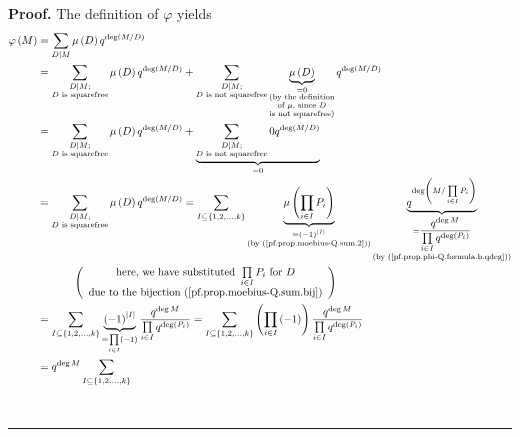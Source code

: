 \documentclass[numbers=enddot,12pt,final,onecolumn,notitlepage]{scrartcl}%
\theoremstyle{definition}
\newenvironment{proof}[1][Proof]{\noindent\textbf{#1.} }{\ \rule{0.5em}{0.5em}}
\let\sumnonlimits\sum
\let\prodnonlimits\prod
\renewcommand{\sum}{\sumnonlimits\limits}
\renewcommand{\prod}{\prodnonlimits\limits}
\begin{document}
\begin{proof}
The definition of $\varphi$ yields%
\begin{align*}
\varphi\left(  M\right)   &  =\sum\limits_{D\mid M}\mu\left(  D\right)
q^{\deg\left(  M/D\right)  }\\
&  =\sum_{\substack{D\mid M;\\D\text{ is squarefree}}}\mu\left(  D\right)
q^{\deg\left(  M/D\right)  }+\sum_{\substack{D\mid M;\\D\text{ is not
squarefree}}}\underbrace{\mu\left(  D\right)  }_{\substack{=0\\\text{(by the
definition}\\\text{of }\mu\text{, since }D\\\text{is not squarefree)}}%
}q^{\deg\left(  M/D\right)  }\\
&  =\sum_{\substack{D\mid M;\\D\text{ is squarefree}}}\mu\left(  D\right)
q^{\deg\left(  M/D\right)  }+\underbrace{\sum_{\substack{D\mid M;\\D\text{ is
not squarefree}}}0q^{\deg\left(  M/D\right)  }}_{=0}\\
&  =\sum_{\substack{D\mid M;\\D\text{ is squarefree}}}\mu\left(  D\right)
q^{\deg\left(  M/D\right)  }=\sum_{I\subseteq\left\{  1,2,\ldots,k\right\}
}\underbrace{\mu\left(  \prod_{i\in I}P_{i}\right)  }_{\substack{=\left(
-1\right)  ^{\left\vert I\right\vert }\\\text{(by
(\ref{pf.prop.moebius-Q.sum.2}))}}}\underbrace{q^{\deg\left(  M/\prod_{i\in
I}P_{i}\right)  }}_{\substack{=\dfrac{q^{\deg M}}{\prod_{i\in I}q^{\deg\left(
P_{i}\right)  }}\\\text{(by (\ref{pf.prop.phi-Q.formula.b.qdeg}))}}}\\
&  \ \ \ \ \ \ \ \ \ \ \left(
\begin{array}
[c]{c}%
\text{here, we have substituted }\prod_{i\in I}P_{i}\text{ for }D\\
\text{due to the bijection (\ref{pf.prop.moebius-Q.sum.bij})}%
\end{array}
\right) \\
&  =\sum_{I\subseteq\left\{  1,2,\ldots,k\right\}  }\underbrace{\left(
-1\right)  ^{\left\vert I\right\vert }}_{=\prod_{i\in I}\left(  -1\right)
}\dfrac{q^{\deg M}}{\prod_{i\in I}q^{\deg\left(  P_{i}\right)  }}%
=\sum_{I\subseteq\left\{  1,2,\ldots,k\right\}  }\left(  \prod_{i\in I}\left(
-1\right)  \right)  \dfrac{q^{\deg M}}{\prod_{i\in I}q^{\deg\left(
P_{i}\right)  }}\\
&  =q^{\deg M}\sum_{I\subseteq\left\{  1,2,\ldots,k\right\}  }%

\end{align*}
\end{proof}
\end{document}
